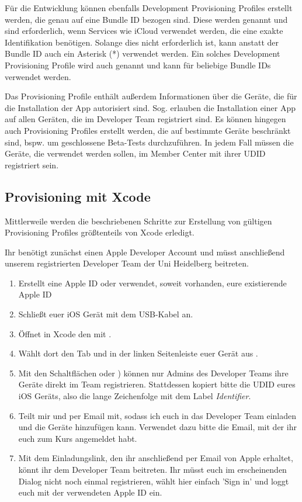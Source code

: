 \documentclass[parskip=half, final]{scrreprt}
\begin{document}
Für die Entwicklung können ebenfalls Development Provisioning Profiles erstellt werden, die genau auf eine Bundle ID bezogen sind. Diese werden  genannt und sind erforderlich, wenn Services wie iCloud verwendet werden, die eine exakte Identifikation benötigen. Solange dies nicht erforderlich ist, kann anstatt der Bundle ID auch ein Asterisk (*) verwendet werden. Ein solches Development Provisioning Profile wird auch  genannt und kann für beliebige Bundle IDs verwendet werden.

Das Provisioning Profile enthält außerdem Informationen über die Geräte, die für die Installation der App autorisiert sind. Sog.  erlauben die Installation einer App auf allen Geräten, die im Developer Team registriert sind. Es können hingegen auch Provisioning Profiles erstellt werden, die auf bestimmte Geräte beschränkt sind, bspw. um geschlossene Beta-Tests durchzuführen. In jedem Fall müssen die Geräte, die verwendet werden sollen, im Member Center mit ihrer UDID registriert sein.
 
\subsection{Provisioning mit Xcode}\label{sec:xcodeprovisioning}

Mittlerweile werden die beschriebenen Schritte zur Erstellung von gültigen Provisioning Profiles größtenteils von Xcode erledigt.

Ihr benötigt zunächst einen Apple Developer Account und müsst anschließend unserem registrierten Developer Team der Uni Heidelberg beitreten.
\begin{enumerate}
\item Erstellt eine Apple ID  oder verwendet, soweit vorhanden, eure existierende Apple ID
\item Schließt euer iOS Gerät mit dem USB-Kabel an.
\item Öffnet in Xcode den  mit .
\item Wählt dort den Tab  und in der linken Seitenleiste euer Gerät aus .
\item Mit den Schaltflächen  oder ) können nur Admins des Developer Teams ihre Geräte direkt im Team registrieren. Stattdessen kopiert bitte die UDID eures iOS Geräts, also die lange Zeichenfolge mit dem Label \emph{Identifier}.
\item Teilt mir  und  per Email  mit, sodass ich euch in das Developer Team einladen und die Geräte hinzufügen kann. Verwendet dazu bitte die Email, mit der ihr euch zum Kurs angemeldet habt.
\item Mit dem Einladungslink, den ihr anschließend per Email von Apple erhaltet, könnt ihr dem Developer Team beitreten. Ihr müsst euch im erscheinenden Dialog nicht noch einmal registrieren, wählt hier einfach 'Sign in' und loggt euch mit der verwendeten Apple ID ein.
\end{enumerate}
\end{document}
